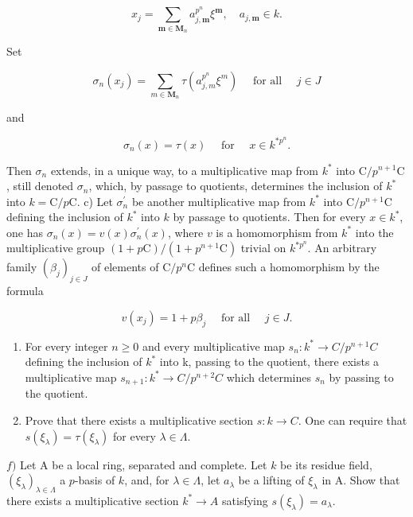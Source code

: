 \[
x _ {j} = \sum_ {\boldsymbol {m} \in \mathbf {M} _ {n}} a _ {j, \boldsymbol {m}} ^ {p ^ {n}} \xi^ {\boldsymbol {m}}, \quad a _ {j, \boldsymbol {m}} \in k.
\]

Set

\[
\sigma_ {n} (x _ {j}) = \sum_ {m \in \mathbf {M} _ {n}} \tau (a _ {j, m} ^ {p ^ {n}} \xi^ {m}) \quad \text { for all } \quad j \in J
\]

and

\[
\sigma_ {n} (x) = \tau (x) \quad \text { for } \quad x \in k ^ {* p ^ {n}}.
\]

Then \(\sigma_{n}\) extends, in a unique way, to a multiplicative map from \(k^{*}\) into \(\mathrm{C} / p^{n + 1}\mathrm{C}\), still denoted \(\sigma_{n}\), which, by passage to quotients, determines the inclusion of \(k^{*}\) into \(k = \mathrm{C} / p\mathrm{C}\). c) Let \(\sigma_{n}^{\prime}\) be another multiplicative map from \(k^{*}\) into \(\mathrm{C} / p^{n + 1}\mathrm{C}\) defining the inclusion of \(k^{*}\) into \(k\) by passage to quotients. Then for every \(x\in k^{*}\), one has \(\sigma_{n}(x) = v(x)\sigma_{n}^{\prime}(x)\), where \(v\) is a homomorphism from \(k^{*}\) into the multiplicative group \((1 + p\mathrm{C}) / (1 + p^{n + 1}\mathrm{C})\) trivial on \(k^{*p^n}\). An arbitrary family \((\beta_j)_{j\in J}\) of elements of \(\mathrm{C} / p^n\mathrm{C}\) defines such a homomorphism by the formula

\[
v (x _ {j}) = 1 + p \beta_ {j} \quad \text { for all } \quad j \in J.
\]

\begin{enumerate}
\def\labelenumi{\alph{enumi})}
\setcounter{enumi}{3}
\item
  For every integer \(n \geqslant 0\) and every multiplicative map \(s_{n}: k^{*} \to C/p^{n+1}C\) defining the inclusion of \(k^{*}\) into k, passing to the quotient, there exists a multiplicative map \(s_{n+1}: k^{*} \to C/p^{n+2}C\) which determines \(s_{n}\) by passing to the quotient.
\item
  Prove that there exists a multiplicative section \(s:k\to C\). One can require that \(s(\xi_{\lambda})=\tau(\xi_{\lambda})\) for every \(\lambda\in\Lambda\).
\end{enumerate}

\(f)\) Let A be a local ring, separated and complete. Let \(k\) be its residue field, \((\xi_{\lambda})_{\lambda \in \Lambda}\) a \(p\)-basis of \(k\), and, for \(\lambda \in \Lambda\), let \(a_{\lambda}\) be a lifting of \(\xi_{\lambda}\) in A. Show that there exists a multiplicative section \(k^{*} \to A\) satisfying \(s(\xi_{\lambda}) = a_{\lambda}\).

